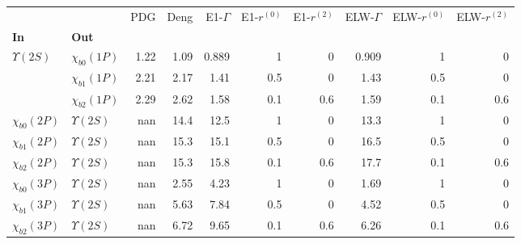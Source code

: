 \begin{tabular}{l|l|r|r|r|r|r|r|r|r}
\toprule
                &                &  PDG &  Deng &  E1-$\Gamma$ &  E1-$r^{(0)}$ &  E1-$r^{(2)}$ &  ELW-$\Gamma$ &  ELW-$r^{(0)}$ &  ELW-$r^{(2)}$ \\
\textbf{In} & \textbf{Out} &      &       &              &               &               &               &                &                \\
\midrule
\textbf{$\Upsilon(2S)$} & \textbf{$\chi_{b0}(1P)$} & 1.22 &  1.09 &        0.889 &             1 &             0 &         0.909 &              1 &              0 \\
                & \textbf{$\chi_{b1}(1P)$} & 2.21 &  2.17 &         1.41 &           0.5 &             0 &          1.43 &            0.5 &              0 \\
                & \textbf{$\chi_{b2}(1P)$} & 2.29 &  2.62 &         1.58 &           0.1 &           0.6 &          1.59 &            0.1 &            0.6 \\
\textbf{$\chi_{b0}(2P)$} & \textbf{$\Upsilon(2S)$} &  nan &  14.4 &         12.5 &             1 &             0 &          13.3 &              1 &              0 \\
\textbf{$\chi_{b1}(2P)$} & \textbf{$\Upsilon(2S)$} &  nan &  15.3 &         15.1 &           0.5 &             0 &          16.5 &            0.5 &              0 \\
\textbf{$\chi_{b2}(2P)$} & \textbf{$\Upsilon(2S)$} &  nan &  15.3 &         15.8 &           0.1 &           0.6 &          17.7 &            0.1 &            0.6 \\
\textbf{$\chi_{b0}(3P)$} & \textbf{$\Upsilon(2S)$} &  nan &  2.55 &         4.23 &             1 &             0 &          1.69 &              1 &              0 \\
\textbf{$\chi_{b1}(3P)$} & \textbf{$\Upsilon(2S)$} &  nan &  5.63 &         7.84 &           0.5 &             0 &          4.52 &            0.5 &              0 \\
\textbf{$\chi_{b2}(3P)$} & \textbf{$\Upsilon(2S)$} &  nan &  6.72 &         9.65 &           0.1 &           0.6 &          6.26 &            0.1 &            0.6 \\
\bottomrule
\end{tabular}
